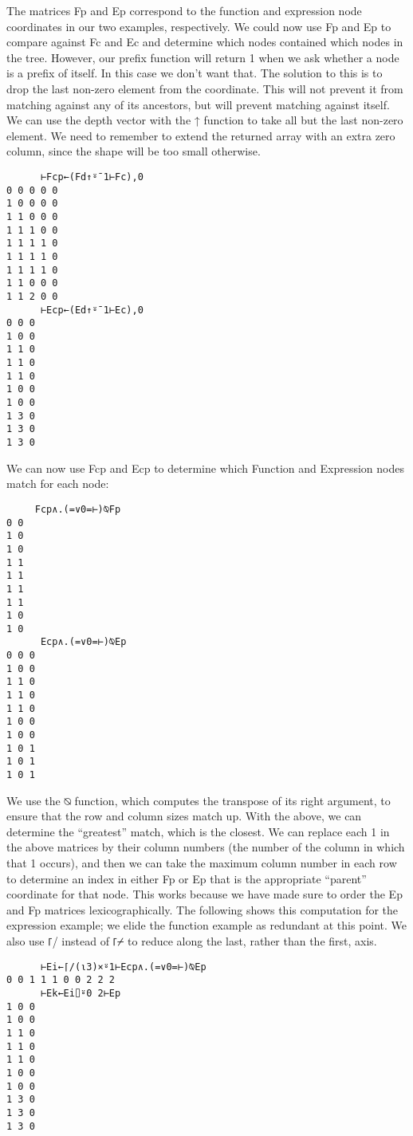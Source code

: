 \documentclass[pldi]{sigplanconf-pldi15}
\begin{document}
The matrices Fp and Ep correspond to the function and expression node coordinates in our two 
examples, respectively. We could now use Fp and Ep to compare against Fc and Ec and determine 
which nodes contained which nodes in the tree. However, our prefix function will return 1 when we 
ask whether a node is a prefix of itself. In this case we don’t want that. The solution to this is to 
drop the last non-zero element from the coordinate. This will not prevent it from matching against 
any of its ancestors, but will prevent matching against itself. We can use the depth vector with the 
↑ function to take all but the last non-zero element. We need to remember to extend the returned 
array with an extra zero column, since the shape will be too small otherwise. 

\begin{verbatim}
      ⊢Fcp←(Fd↑⍤¯1⊢Fc),0
0 0 0 0 0
1 0 0 0 0
1 1 0 0 0
1 1 1 0 0
1 1 1 1 0
1 1 1 1 0
1 1 1 1 0
1 1 0 0 0
1 1 2 0 0
      ⊢Ecp←(Ed↑⍤¯1⊢Ec),0
0 0 0
1 0 0
1 1 0
1 1 0
1 1 0
1 0 0
1 0 0
1 3 0
1 3 0
1 3 0
\end{verbatim}

We can now use Fcp and Ecp to determine which Function and Expression nodes match for each node:

\begin{verbatim}
     Fcp∧.(=∨0=⊢)⍉Fp
0 0
1 0
1 0
1 1
1 1
1 1
1 1
1 0
1 0
      Ecp∧.(=∨0=⊢)⍉Ep
0 0 0
1 0 0
1 1 0
1 1 0
1 1 0
1 0 0
1 0 0
1 0 1
1 0 1
1 0 1
\end{verbatim}

We use the ⍉ function, which computes the transpose of its right argument, to ensure that the row 
and column sizes match up. With the above, we can determine the “greatest” match, which is the closest. 
We can replace each 1 in the above matrices by their column numbers (the number of the column in which 
that 1 occurs), and then we can take the maximum column number in each row to determine an index in 
either Fp or Ep that is the appropriate “parent” coordinate for that node. This works because we have 
made sure to order the Ep and Fp matrices lexicographically. The following shows this computation for 
the expression example; we elide the function example as redundant at this point. We also use ⌈/ instead 
of ⌈⌿ to reduce along the last, rather than the first, axis. 

\begin{verbatim}
      ⊢Ei←⌈/(⍳3)×⍤1⊢Ecp∧.(=∨0=⊢)⍉Ep
0 0 1 1 1 0 0 2 2 2
      ⊢Ek←Ei⌷⍤0 2⊢Ep 
1 0 0
1 0 0
1 1 0
1 1 0
1 1 0
1 0 0
1 0 0
1 3 0
1 3 0
1 3 0
\end{verbatim}
\end{document}
